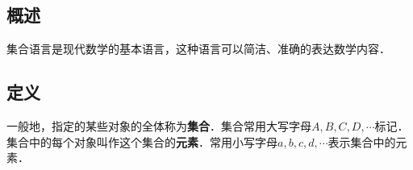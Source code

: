 \subsection{概述}
集合语言是现代数学的基本语言，这种语言可以简洁、准确的表达数学内容．

\subsection{定义}
一般地，指定的某些对象的全体称为\textbf{集合}．集合常用大写字母$A,B,C,D,\cdots$标记．集合中的每个对象叫作这个集合的\textbf{元素}．常用小写字母$a,b,c,d,\cdots$表示集合中的元素．